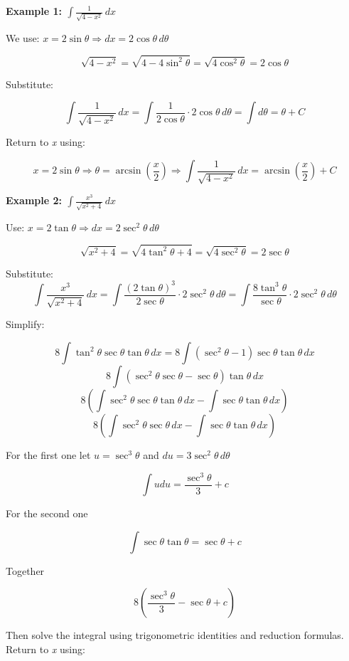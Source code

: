 \textbf{Example 1: \( \int \frac{1}{\sqrt{4 - x^2}} \,dx \)}
\vspace{\baselineskip}

We use: \( x = 2\sin \theta \Rightarrow dx = 2\cos \theta\, d\theta \)

\[
    \sqrt{4 - x^2} = \sqrt{4 - 4\sin^2 \theta} = \sqrt{4\cos^2 \theta} = 2\cos \theta
\]

Substitute:

\[
    \int \frac{1}{\sqrt{4 - x^2}} \,dx = \int \frac{1}{2\cos \theta} \cdot 2\cos \theta \,d\theta = 
    \int d\theta = \theta + C
\]

Return to \emph{x} using:

\[
    x = 2\sin \theta \Rightarrow \theta = \arcsin\left(\frac{x}{2}\right)
    \Rightarrow \boxed{\int \frac{1}{\sqrt{4 - x^2}} \,dx = \arcsin\left(\frac{x}{2}\right) + C}
\]


\textbf{Example 2: \( \int \frac{x^3}{\sqrt{x^2 + 4}} \,dx \)}
\vspace{\baselineskip}

Use: \( x = 2\tan \theta \Rightarrow dx = 2\sec^2 \theta\, d\theta \)

\[
    \sqrt{x^2 + 4} = \sqrt{4\tan^2 \theta + 4} = \sqrt{4\sec^2 \theta} = 2\sec \theta
\]

Substitute:
\[
    \int \frac{x^3}{\sqrt{x^2 + 4}}\,dx = \int \frac{{(2\tan \theta)}^3}{2\sec \theta} \cdot 2\sec^2 \theta\, d\theta
    = \int \frac{8\tan^3 \theta}{\sec \theta} \cdot 2\sec^2 \theta\, d\theta
\]

Simplify:

\[
    8\int \tan^{2}\theta\sec\theta\tan\theta \,dx = 8\int (\sec^2\theta - 1)\sec\theta\tan\theta \,dx 
\]
\[
    8\int (\sec^2\theta\sec\theta - \sec\theta)\tan\theta \,dx 
\]
\[
    8\left(\int \sec^2\theta\sec\theta\tan\theta \,dx - \int\sec\theta\tan\theta \,dx \right) 
\]
\[
    8\left(\int \sec^2\theta\sec\theta \,dx - \int\sec\theta\tan\theta \,dx \right) 
\]

For the first one let \(u = \sec^3\theta\) and \(du = 3\sec^2\theta\,d\theta\) 

\[
    \int udu = \frac{\sec^3\theta}{3} + c
\]

For the second one

\[
    \int \sec\theta\tan\theta = \sec\theta + c
\]

Together

\[
    8\left(  \frac{\sec^3\theta}{3} - \sec\theta + c\right)
\]

Then solve the integral using trigonometric identities and reduction formulas. Return to \emph{x} using:

